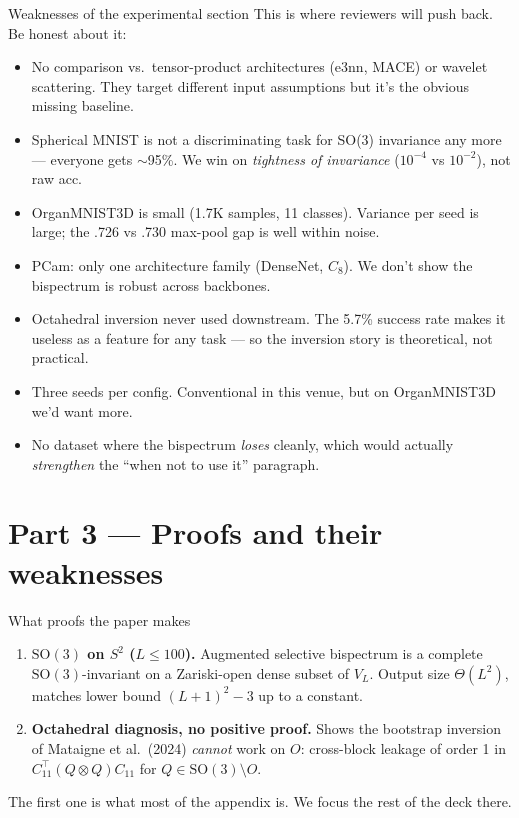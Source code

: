\documentclass[10pt,aspectratio=169]{beamer}
\newcommand{\SO}{\mathrm{SO}}
\begin{document}
\begin{frame}{Weaknesses of the experimental section}
\small
This is where reviewers will push back. Be honest about it:
\begin{itemize}
  \item \alert{No comparison vs.\ tensor-product architectures}
        (e3nn, MACE) or wavelet scattering. They target different
        input assumptions but it's the obvious missing baseline.
  \item \alert{Spherical MNIST is not a discriminating task} for SO(3)
        invariance any more --- everyone gets $\sim$95\%. We win on
        \emph{tightness of invariance} ($10^{-4}$ vs $10^{-2}$), not raw acc.
  \item \alert{OrganMNIST3D is small} (1.7K samples, 11 classes).
        Variance per seed is large; the .726 vs .730 max-pool gap is
        well within noise.
  \item \alert{PCam: only one architecture family} (DenseNet, $C_8$).
        We don't show the bispectrum is robust across backbones.
  \item \alert{Octahedral inversion never used downstream.} The 5.7\% success
        rate makes it useless as a feature for any task --- so the inversion
        story is theoretical, not practical.
  \item Three seeds per config. Conventional in this venue, but on
        OrganMNIST3D we'd want more.
  \item No dataset where the bispectrum \emph{loses} cleanly, which would
        actually \emph{strengthen} the ``when not to use it'' paragraph.
\end{itemize}
\end{frame}

\section{Part 3 --- Proofs and their weaknesses}

\begin{frame}{What proofs the paper makes}
\begin{enumerate}
  \item \textbf{$\SO(3)$ on $S^2$ ($L \le 100$).}
        Augmented selective bispectrum is a complete $\SO(3)$-invariant
        on a Zariski-open dense subset of $V_L$. Output size $\Theta(L^2)$,
        matches lower bound $(L{+}1)^2 - 3$ up to a constant.
  \item \textbf{Octahedral diagnosis, no positive proof.}
        Shows the bootstrap inversion of Mataigne et al.\ (2024)
        \emph{cannot} work on $O$: cross-block leakage of order 1 in
        $C_{11}^\top (Q\otimes Q) C_{11}$ for $Q \in \SO(3)\setminus O$.
\end{enumerate}
\vspace{0.6em}
The first one is what most of the appendix is. We focus the rest of the
deck there.
\end{frame}
\end{document}
